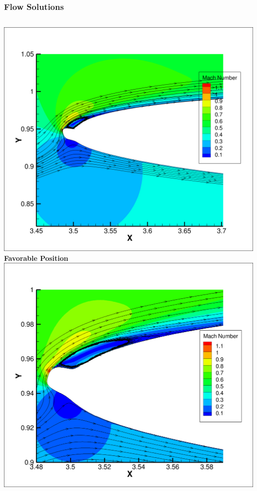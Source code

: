 \documentclass[9pt]{beamer}
\begin{document}
\begin{frame}
\frametitle{Flow Solutions}
\label{sec-2-10}


\begin{columns}[c]
    \centering
    \includegraphics[width=1\textwidth]{GoodHorn.png} \\
    {\bf Favorable Position}
    \includegraphics[width=1\textwidth]{GoodHornPOD.png} \\

\end{columns}
\end{frame}
\end{document}
